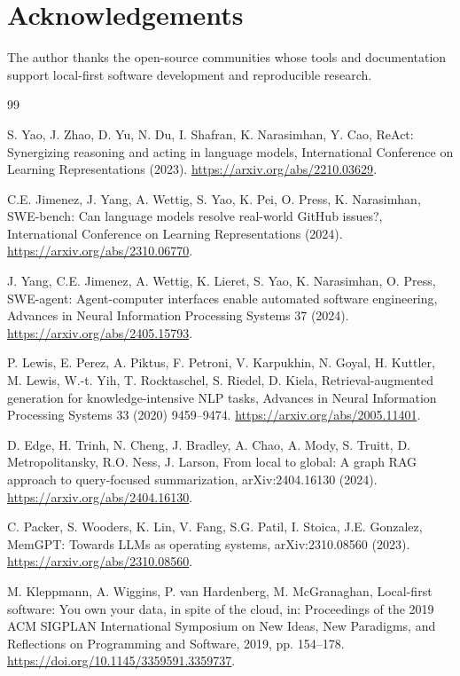\documentclass[preprint,12pt,a4paper]{elsarticle}
\begin{document}
\section*{Acknowledgements}

The author thanks the open-source communities whose tools and documentation
support local-first software development and reproducible research.

\begin{thebibliography}{99}

S. Yao, J. Zhao, D. Yu, N. Du, I. Shafran, K. Narasimhan, Y. Cao,
ReAct: Synergizing reasoning and acting in language models,
International Conference on Learning Representations (2023).
\url{https://arxiv.org/abs/2210.03629}.

C.E. Jimenez, J. Yang, A. Wettig, S. Yao, K. Pei, O. Press,
K. Narasimhan, SWE-bench: Can language models resolve real-world GitHub
issues?, International Conference on Learning Representations (2024).
\url{https://arxiv.org/abs/2310.06770}.

J. Yang, C.E. Jimenez, A. Wettig, K. Lieret, S. Yao, K. Narasimhan,
O. Press, SWE-agent: Agent-computer interfaces enable automated software
engineering, Advances in Neural Information Processing Systems 37 (2024).
\url{https://arxiv.org/abs/2405.15793}.

P. Lewis, E. Perez, A. Piktus, F. Petroni, V. Karpukhin, N. Goyal,
H. Kuttler, M. Lewis, W.-t. Yih, T. Rocktaschel, S. Riedel, D. Kiela,
Retrieval-augmented generation for knowledge-intensive NLP tasks,
Advances in Neural Information Processing Systems 33 (2020) 9459--9474.
\url{https://arxiv.org/abs/2005.11401}.

D. Edge, H. Trinh, N. Cheng, J. Bradley, A. Chao, A. Mody, S. Truitt,
D. Metropolitansky, R.O. Ness, J. Larson, From local to global: A graph RAG
approach to query-focused summarization, arXiv:2404.16130 (2024).
\url{https://arxiv.org/abs/2404.16130}.

C. Packer, S. Wooders, K. Lin, V. Fang, S.G. Patil, I. Stoica,
J.E. Gonzalez, MemGPT: Towards LLMs as operating systems,
arXiv:2310.08560 (2023).
\url{https://arxiv.org/abs/2310.08560}.

M. Kleppmann, A. Wiggins, P. van Hardenberg, M. McGranaghan,
Local-first software: You own your data, in spite of the cloud,
in: Proceedings of the 2019 ACM SIGPLAN International Symposium on New Ideas,
New Paradigms, and Reflections on Programming and Software, 2019, pp. 154--178.
\url{https://doi.org/10.1145/3359591.3359737}.


\end{thebibliography}
\end{document}
